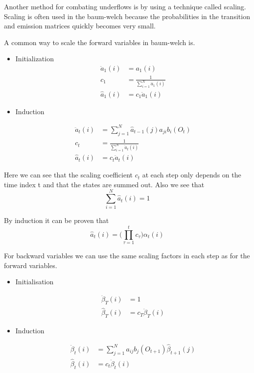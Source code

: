 Another method for combating underflows is by using a technique called scaling.
Scaling is often used in the baum-welch because the probabilities in the
transition and emission matrices quickly becomes very small.\cite[p.5]{shen2008}

A common way to scale the forward variables in baum-welch is.

\begin{itemize}
\item Initialization
\begin{align*}
\ddot{a}_1(i) &= a_1(i) \\
c_1 &= \frac{1}{\sum_{i=1}^N \ddot{a}_1(i)} \\
{\hat{a}}_1(i) &= c_1 \ddot{a}_1(i)
\end{align*}

\item Induction

\begin{align*}
\ddot{a}_t(i) &= \sum_{j=1}^N \hat{a}_{t-1}(j) a_{ji} b_i(O_t)  \\
c_t &= \frac{1}{\sum_{i=1}^N \ddot{a}_t(i)} \\
{\hat{a}}_t(i) &= c_t \ddot{a}_t(i)
\end{align*}
\end{itemize}

Here we can see that the scaling coefficient $c_t$ at each step only depends on 
the time index t and that the states are summed out.
Also we see that
$$\sum_{i=1}^N \hat{a}_t(i) = 1$$

By induction it can be proven that
$$\hat{a}_t(i) = \bigg(\prod_{\tau=1}^t c_{\tau}\bigg)\alpha_t(i)$$
\cite[p.5]{shen2008}

For backward variables we can use the same scaling factors in each step as for
the forward variables.

\begin{itemize}
\item Initialisation

\begin{align*}
\ddot{\beta}_T(i) &= 1 \\
\hat{\beta}_T(i) &= c_T \ddot{\beta}_T(i)
\end{align*}
\item Induction

\begin{align*}
\ddot{\beta}_t(i) &= \sum_{j=1}^N a_{ij}b_j(O_{t+1})\hat{\beta}_{t+1}(j) \\
\hat{\beta}_t(i) &= c_t \ddot{\beta}_t(i)
\end{align*}

\end{itemize}
\cite[p.6]{shen2008}

%
